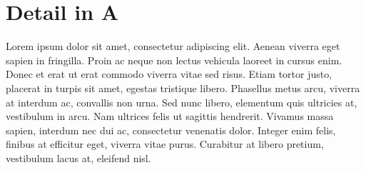 \section{Detail in A}

Lorem ipsum dolor sit amet, consectetur adipiscing elit. Aenean viverra eget sapien in fringilla. Proin ac neque non lectus vehicula laoreet in cursus enim. Donec et erat ut erat commodo viverra vitae sed risus. Etiam tortor justo, placerat in turpis sit amet, egestas tristique libero. Phasellus metus arcu, viverra at interdum ac, convallis non urna. Sed nunc libero, elementum quis ultricies at, vestibulum in arcu. Nam ultrices felis ut sagittis hendrerit. Vivamus massa sapien, interdum nec dui ac, consectetur venenatis dolor. Integer enim felis, finibus at efficitur eget, viverra vitae purus. Curabitur at libero pretium, vestibulum lacus at, eleifend nisl.

